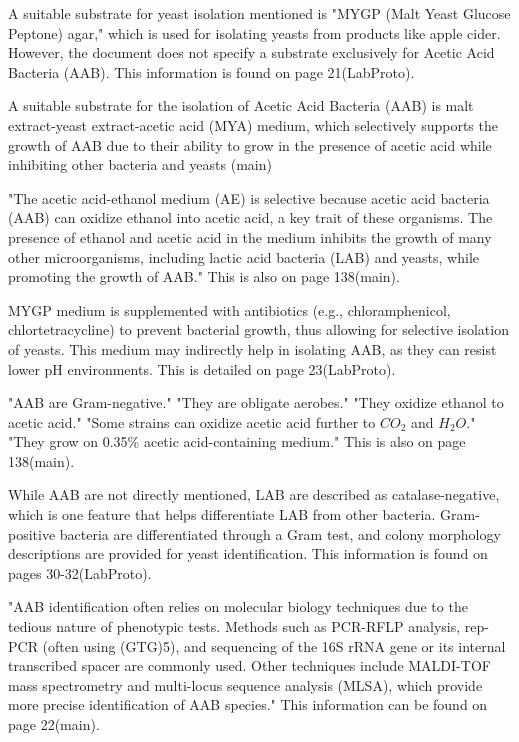 A suitable substrate for yeast isolation mentioned is "MYGP (Malt Yeast Glucose Peptone) agar," which is used for isolating yeasts from products like apple cider. However, the document does not specify a substrate exclusively for Acetic Acid Bacteria (AAB). This information is found on page 21(LabProto).

A suitable substrate for the isolation of Acetic Acid Bacteria (AAB) is malt extract-yeast extract-acetic acid (MYA) medium, which selectively supports the growth of AAB due to their ability to grow in the presence of acetic acid while inhibiting other bacteria and yeasts (main) 

"The acetic acid-ethanol medium (AE) is selective because acetic acid bacteria (AAB) can oxidize ethanol into acetic acid, a key trait of these organisms. The presence of ethanol and acetic acid in the medium inhibits the growth of many other microorganisms, including lactic acid bacteria (LAB) and yeasts, while promoting the growth of AAB."
This is also on page 138(main).

MYGP medium is supplemented with antibiotics (e.g., chloramphenicol, chlortetracycline) to prevent bacterial growth, thus allowing for selective isolation of yeasts. This medium may indirectly help in isolating AAB, as they can resist lower pH environments. This is detailed on page 23(LabProto).

"AAB are Gram-negative."
"They are obligate aerobes."
"They oxidize ethanol to acetic acid."
"Some strains can oxidize acetic acid further to $CO_2$ and $H_2O$."
"They grow on 0.35\% acetic acid-containing medium."
This is also on page 138(main).

While AAB are not directly mentioned, LAB are described as catalase-negative, which is one feature that helps differentiate LAB from other bacteria. Gram-positive bacteria are differentiated through a Gram test, and colony morphology descriptions are provided for yeast identification. This information is found on pages 30-32(LabProto).

"AAB identification often relies on molecular biology techniques due to the tedious nature of phenotypic tests. Methods such as PCR-RFLP analysis, rep-PCR (often using (GTG)5), and sequencing of the 16S rRNA gene or its internal transcribed spacer are commonly used. Other techniques include MALDI-TOF mass spectrometry and multi-locus sequence analysis (MLSA), which provide more precise identification of AAB species."
This information can be found on page 22(main).

